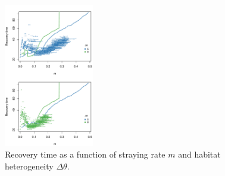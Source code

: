 \documentclass[twocolumn,preprintnumbers,amsmath,amssymb,superscriptaddress]{revtex4}
\begin{document}
\begin{figure}
  \captionsetup{justification=raggedright,
singlelinecheck=false
}
\centering
\includegraphics[width=0.35\textwidth]{figs2/fig_relaxtheta.pdf}
\caption{
Recovery time as a function of straying rate $m$ and habitat heterogeneity $\Delta\theta$.
} \label{fig:relaxtheta}
\end{figure}






\end{document}
